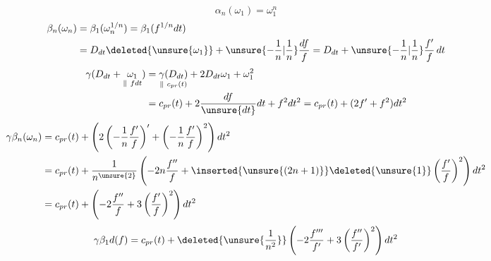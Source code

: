\[
\alpha_n(\omega_1)=\omega_1^n
\]
\[
\begin{aligned}
\beta_n(\omega_n)&=\beta_1(\omega_n^{1/n})
=\beta_1(f^{1/n}dt)\\
&=D_{dt}\deleted{\unsure{\omega_1}}
+\unsure{-\frac1n|\frac1n}\frac{df}{f}
=D_{dt}+\unsure{-\frac1n|\frac1n}\frac{f'}f\,dt
\end{aligned}
\]
\[
\begin{aligned}
\gamma(D_{dt}+\underset{\Vert\ fdt}{\omega_1})
&=\underset{\Vert\ c_{pr}(t)}{\gamma(D_{dt})}
+2D_{dt}\omega_1+\omega_1^2\\
&=c_{pr}(t)+2\frac{df}{\unsure{dt}}dt+f^2dt^2
=c_{pr}(t)+(2f'+f^2)dt^2
\end{aligned}
\]
\[
\begin{aligned}
\gamma\beta_n(\omega_n)
&=c_{pr}(t)+\left(2\left(-\frac1n\frac{f'}f\right)'
+\left(-\frac1n\frac{f'}f\right)^2\right)dt^2\\
&=c_{pr}(t)+\frac1{n^{\unsure{2}}}
\left(-2n\frac{f''}f+\inserted{\unsure{(2n+1)}}
\deleted{\unsure{1}}\left(\frac{f'}f\right)^2\right)dt^2\\
&=c_{pr}(t)+\left(-2\frac{f''}f+3\left(\frac{f'}f\right)^2\right)dt^2
\end{aligned}
\]
\[
\gamma\beta_1d(f)=c_{pr}(t)+\deleted{\unsure{\frac1{n^2}}}
\left(-2\frac{f'''}{f'}+3\left(\frac{f''}{f'}\right)^2\right)dt^2
\]
\margin{\[
\begin{aligned}
\delta(\omega_2)&=\gamma\beta_2(\omega_2)+\omega_2\\
&=c_{pr}(\unsure{\omega_1|t})+
\left[f-\unsure{\frac{f''}f|2\frac{f''}f}+\frac54\left(\frac{f'}f\right)^2\right]dt^2\\
\delta\alpha'_2(\omega_1)&=\gamma\beta_1(\omega_1)
\deleted{\unsure{^{2}}}+\omega_1^{\unsure{2|1}}\\
&=c_{pr}(t)+\left[f^2-2\frac{f''}f+3\left(\frac{f'}f\right)^2\right]dt^2
\end{aligned}
\]}

